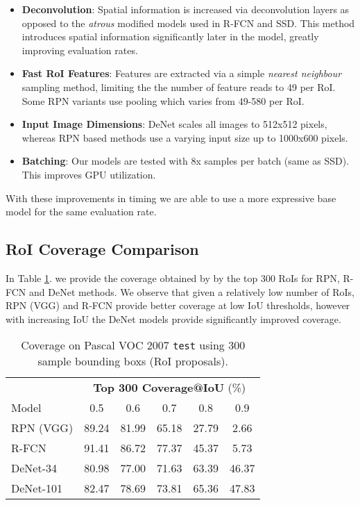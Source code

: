 \documentclass[10pt,twocolumn]{article}
\begin{document}
\begin{itemize}
\item \textbf{Deconvolution}: Spatial information is increased via deconvolution layers as opposed to the \textit{atrous} modified models used in R-FCN and SSD. This method introduces spatial information significantly later in the model, greatly improving evaluation rates. 
\item \textbf{Fast RoI Features}: Features are extracted via a simple \textit{nearest neighbour} sampling method, limiting the the number of feature reads to 49 per RoI. Some RPN variants use pooling which varies from 49-580 per RoI. 
\item \textbf{Input Image Dimensions}: DeNet scales all images to 512x512 pixels, whereas RPN based methods use a varying input size up to 1000x600 pixels.  
\item \textbf{Batching}: Our models are tested with 8x samples per batch (same as SSD). This improves GPU utilization. 
\end{itemize}

With these improvements in timing we are able to use a more expressive base model for the same evaluation rate. 

\subsection{RoI Coverage Comparison}
 
In Table \ref{table:roi_quality}. we provide the coverage obtained by by the top 300 RoIs for RPN, R-FCN and DeNet methods. We observe that given a relatively low number of RoIs, RPN (VGG) and R-FCN provide better coverage at low IoU thresholds, however with increasing IoU the DeNet models provide significantly improved coverage.

\begin{table}[htb]
\begin{center}
\begin{tabular}{l|c|c|c|c|c}
 & \multicolumn{5}{c}{\textbf{Top 300 Coverage@IoU} (\%)}\\
Model & 0.5 & 0.6 & 0.7 & 0.8 & 0.9\\
\hline
\rowcolor[gray]{.85} RPN (VGG) & 89.24 & 81.99& 65.18 & 27.79 & 2.66\\
\rowcolor[gray]{.85} R-FCN & 91.41 & 86.72 & 77.37 & 45.37 & 5.73\\
DeNet-34 & 80.98 & 77.00 & 71.63 & 63.39 & 46.37 \\
DeNet-101 & 82.47 & 78.69 & 73.81 & 65.36 & 47.83\\
\end{tabular}
\end{center}
\caption{Coverage on Pascal VOC 2007 \texttt{test} using 300 sample bounding boxs (RoI proposals).}
\label{table:roi_quality}
\end{table}
\end{document}
